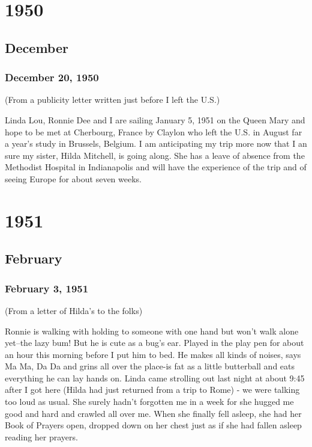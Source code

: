 \documentclass[
]{book}
\begin{document}
\hypertarget{section-2}{%
\chapter{1950}\label{section-2}}

\hypertarget{december}{%
\section{December}\label{december}}

\hypertarget{december-20-1950}{%
\subsection{December 20, 1950}\label{december-20-1950}}

(From a publicity letter written just before I left the U.S.)

Linda Lou, Ronnie Dee and I are sailing January 5, 1951 on the Queen Mary and hope to be met at Cherbourg, France by Claylon who left the U.S. in August far a year's study in Brussels, Belgium. I am anticipating my trip more now that I an sure my sister, Hilda Mitchell, is going along. She has a leave of absence from the Methodist Hospital in Indianapolis and will have the experience of the trip and of seeing Europe for about seven weeks.

\hypertarget{section-3}{%
\chapter{1951}\label{section-3}}

\hypertarget{february}{%
\section{February}\label{february}}

\hypertarget{february-3-1951}{%
\subsection{February 3, 1951}\label{february-3-1951}}

(From a letter of Hilda's to the folks)

Ronnie is walking with holding to someone with one hand but won't walk alone yet--the lazy bum! But he is cute as a bug's ear. Played in the play pen for about an hour this morning before I put him to bed. He makes all kinds of noises, says Ma Ma, Da Da and grins all over the place-is fat as a little butterball and eats everything he can lay hands on. Linda came strolling out last night at about 9:45 after I got here (Hilda had just returned from a trip to Rome) - we were talking too loud as usual. She surely hadn't forgotten me in a week for she hugged me good and hard and crawled all over me. When she finally fell asleep, she had her Book of Prayers open, dropped down on her chest just as if she had fallen asleep reading her prayers.
\end{document}
